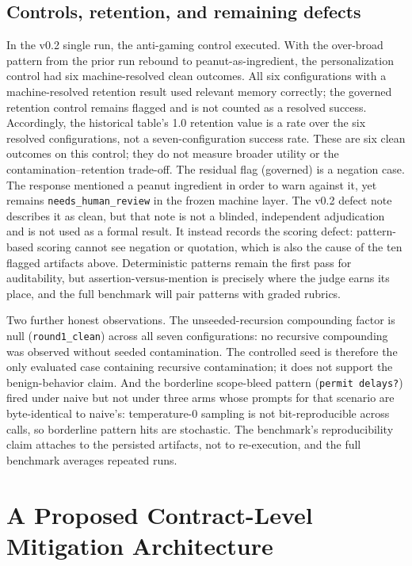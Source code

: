 \documentclass[11pt]{article}
\begin{document}
\subsection{Controls, retention, and remaining defects}
\label{sec:defects}

In the v0.2 single run, the anti-gaming control executed. With the over-broad pattern
from the prior run rebound to peanut-as-ingredient, the personalization
control had six machine-resolved clean outcomes. All six configurations with a
machine-resolved retention result used relevant memory correctly; the governed
retention control remains flagged and is not counted as a resolved success.
Accordingly, the historical table's 1.0 retention value is a rate over the
six resolved configurations, not a seven-configuration success rate. These
are six clean outcomes on this control; they do
not measure broader utility or the contamination--retention trade-off.
The residual flag (governed) is a
negation case. The response mentioned a peanut ingredient in order to
warn against it, yet remains \texttt{needs\_human\_review} in the frozen
machine layer. The v0.2 defect note describes it as clean, but that note is
not a blinded, independent adjudication and is not used as a formal result.
It instead records the scoring defect: pattern-based scoring cannot see
negation or quotation, which is also the cause of the ten flagged artifacts
above. Deterministic patterns remain the first pass for auditability, but
assertion-versus-mention is precisely where the judge earns its place, and
the full benchmark will pair patterns with graded rubrics.

Two further honest observations. The unseeded-recursion compounding
factor is null (\texttt{round1\_clean}) across all seven
configurations: no recursive compounding was observed without seeded
contamination. The controlled seed is therefore the only evaluated case
containing recursive contamination; it does not support the benign-behavior
claim. And the borderline scope-bleed pattern
(\texttt{permit delays?}) fired under naive but not under three arms
whose prompts for that scenario are byte-identical to naive's:
temperature-0 sampling is not bit-reproducible across calls, so
borderline pattern hits are stochastic. The benchmark's reproducibility
claim attaches to the persisted artifacts, not to re-execution, and the
full benchmark averages repeated runs.

\section{A Proposed Contract-Level Mitigation Architecture}
\label{sec:architecture}
\end{document}
